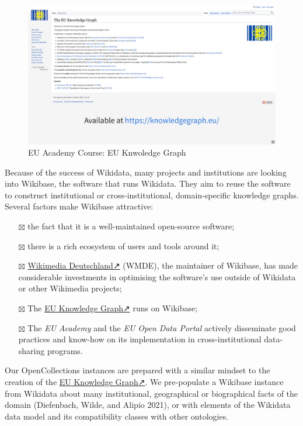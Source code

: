 \documentclass[
  letterpaper,
  DIV=11,
  numbers=noendperiod]{scrreprt}
\begin{document}
\begin{figure}[H]

{\centering \includegraphics{png/wikibase/EU-academy-course/EU-knowledge-graph.png}

}

\caption{EU Academy Course: EU Knwoledge Graph}

\end{figure}%

Because of the success of Wikidata, many projects and institutions are
looking into Wikibase, the software that runs Wikidata. They aim to
reuse the software to construct institutional or cross-institutional,
domain-specific knowledge graphs. Several factors make Wikibase
attractive:

\begin{itemize}
\item[$\boxtimes$]
  the fact that it is a well-maintained open-source software;
\item[$\boxtimes$]
  there is a rich ecosystem of users and tools around it;
\item[$\boxtimes$]
  \href{https://www.wikimedia.de/}{Wikimedia Deutschland↗} (WMDE), the
  maintainer of Wikibase, has made considerable investments in
  optimising the software's use outside of Wikidata or other Wikimedia
  projects;
\item[$\boxtimes$]
  The \href{https://linkedopendata.eu/wiki/The_EU_Knowledge_Graph}{EU
  Knowledge Graph↗} runs on Wikibase;
\item[$\boxtimes$]
  The \emph{EU Academy} and the \emph{EU Open Data Portal} actively
  disseminate good practices and know-how on its implementation in
  cross-institutional data-sharing programs.
\end{itemize}

Our OpenCollections instances are prepared with a similar mindset to the
creation of the
\href{https://linkedopendata.eu/wiki/The_EU_Knowledge_Graph}{EU
Knowledge Graph↗}. We pre-populate a Wikibase instance from Wikidata
about many institutional, geographical or biographical facts of the
domain (Diefenbach, Wilde, and Alipio 2021), or with elements of the
Wikidata data model and its compatibility classes with other ontologies.
\end{document}
